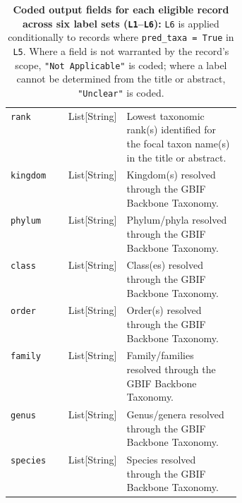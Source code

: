 \documentclass[12pt]{article}
\begin{document}
\begin{landscape}
\begin{table}[p]
\begin{tabularx}{\linewidth}{|>{\raggedright\arraybackslash}p{0.25\linewidth}
                             |>{\raggedright\arraybackslash}p{0.13\linewidth}
                             |>{\raggedright\arraybackslash}X|}
\multicolumn{3}{|l|}{\textit{L6: Taxonomy} (\textit{conditional on} \texttt{pred\_taxa = True})} \\
\hline
\texttt{rank} & List[String] & Lowest taxonomic rank(s) identified for the focal taxon name(s) in the title or abstract. \\
\hline
\texttt{kingdom} & List[String] & Kingdom(s) resolved through the GBIF Backbone Taxonomy. \\
\hline
\texttt{phylum} & List[String] & Phylum/phyla resolved through the GBIF Backbone Taxonomy. \\
\hline
\texttt{class} & List[String] & Class(es) resolved through the GBIF Backbone Taxonomy. \\
\hline
\texttt{order} & List[String] & Order(s) resolved through the GBIF Backbone Taxonomy. \\
\hline
\texttt{family} & List[String] & Family/families resolved through the GBIF Backbone Taxonomy. \\
\hline
\texttt{genus} & List[String] & Genus/genera resolved through the GBIF Backbone Taxonomy. \\
\hline
\texttt{species} & List[String] & Species resolved through the GBIF Backbone Taxonomy. \\
\hline
\end{tabularx}
\vspace{4pt}
\caption{\textbf{Coded output fields for each eligible record across six label sets (\texttt{L1}--\texttt{L6}):} \texttt{L6} is applied conditionally to records where \texttt{pred\_taxa = True} in \texttt{L5}. Where a field is not warranted by the record's scope, \texttt{"Not Applicable"} is coded; where a label cannot be determined from the title or abstract, \texttt{"Unclear"} is coded.}
\label{tab:coding_output_fields}
\end{table}
\end{landscape}
\restoregeometry

\newpage
\end{document}
